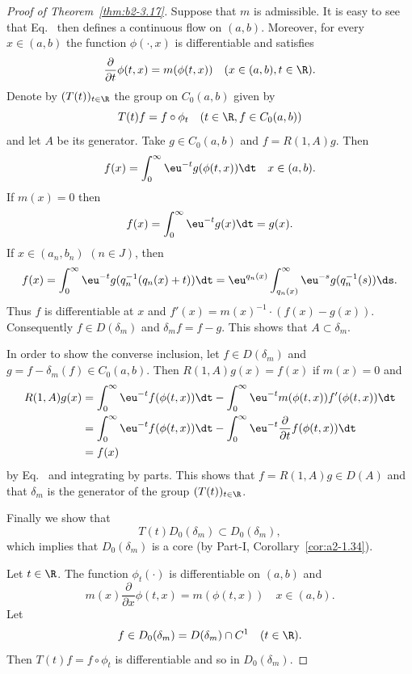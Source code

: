 \begin{proof}[Proof of Theorem~\ref{thm:b2-3.17}]
Suppose that $m$ is admissible.
It is easy to see that Eq.~ then defines a continuous flow on $(a,b)$.
Moreover, for every $x \in (a,b)$ the function $\phi(\cdot,x)$ is differentiable and satisfies
\begin{equation}\label{eq:b2-3.23}
\frac{\partial}{\partial t}\phi(t,x) = m(\phi(t,x)) \quad (x \in (a,b), t \in \R).
\end{equation}
Denote by $(T(t))_{t \in \R}$ the group on $C_{0}(a,b)$ given by 
%
\[
	T(t)f = f \circ \phi_{t} \quad (t \in \R, f \in C_{0}(a,b)) 
\]
%
and let $A$ be its generator.
Take $g \in C_{0}(a,b)$ and $f = R(1,A)g$.
Then %
\[
	f(x) = \int_{0}^{\infty} \eu^{-t}g(\phi(t,x)) \dt \quad x \in (a,b).
\]
%
If\/ $m(x) = 0$ then 
%
\[
	f(x) = \int_{0}^{\infty} \eu^{-t}g(x) \dt = g(x) .
\]
%
If\/ $x \in (a_{n},b_{n})$ $(n \in J)$, then 
\[
f(x) = \int_{0}^{\infty} \eu^{-t}g(q_{n}^{-1}(q_{n}(x) + t)) \dt = \eu^{q_{n}(x)} \int_{q_{n}(x)}^{\infty} \eu^{-s}g(q_{n}^{-1}(s)) \ds.
\]
Thus $f$ is differentiable at $x$ and $f'(x) = m(x)^{-1} \cdot (f(x) - g(x))$.
Consequently $f \in D(\delta_{m})$ and $\delta_{m}f = f - g$.
This shows that $A \subset \delta_{m}$.

In order to show the converse inclusion, let $f \in D(\delta_{m})$ and $g = f - \delta_{m}(f) \in C_{0}(a,b)$.
Then $R(1,A)g(x) = f(x)$ if\/ $m(x) = 0$ and 
\begin{align*}
R(1,A)g(x) &= \int_{0}^{\infty} \eu^{-t}f(\phi(t,x)) \dt - \int_{0}^{\infty} \eu^{-t}m(\phi(t,x))f'(\phi(t,x)) \dt \\
           &= \int_{0}^{\infty} \eu^{-t}f(\phi(t,x)) \dt - \int_{0}^{\infty} \eu^{-t}\frac{\partial}{\partial t}f(\phi(t,x)) \dt 
           \\
           &= f(x) 
\end{align*}
by  Eq.~ and integrating by parts.
This shows that $f = R(1,A)g \in D(A)$ and that $\delta_{m}$ is the generator of the group $(T(t))_{t \in \R}$.

Finally we show that 
%
\[
	T(t)D_{0}(\delta_{m}) \subset D_{0}(\delta_{m}),
\]
%
which implies that $D_{0}(\delta_{m})$ is a core (by Part-I, Corollary~\ref{cor:a2-1.34}).

Let $t \in \R$.
The function $\phi_{t}(\cdot)$ is
differentiable on $(a,b)$ and 
%
\[
	m(x)\frac{\partial}{\partial x}\phi(t,x) = m(\phi(t,x)) \quad x \in (a,b) .
\]
%
Let 
%
\[
	f \in D_{0}(\delta_{m}) = D(\delta_{m}) \cap C^{1} \quad (t \in \R) .
\]
%
Then $T(t)f = f \circ \phi_{t}$ is differentiable and so in $D_{0}(\delta_{m})$.


\end{proof}
